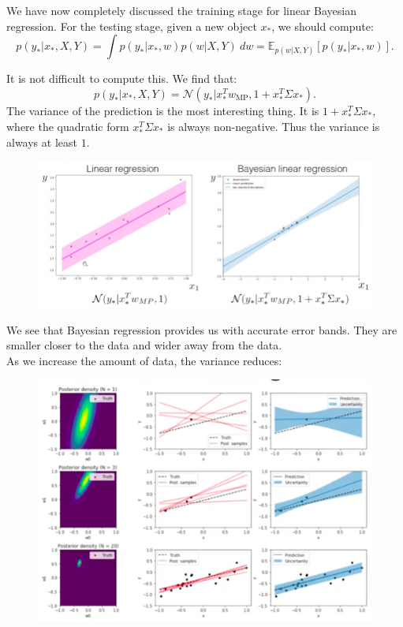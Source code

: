 We have now completely discussed the training stage for linear Bayesian regression. For the testing stage, given a new object $x_*$, we should compute:
\begin{equation*}
p(y_* | x_*, X, Y) = \int p(y_* | x_*, w) p(w | X, Y)\ dw = \mathbb{E}_{p(w|X,Y)} \left[ p(y_* | x_*, w) \right].
\end{equation*}

It is not difficult to compute this. We find that:
\begin{equation*}
p(y_* | x_*, X, Y) = \mathcal{N}(y_* | x_*^T w_{\text{MP}}, 1 + x_*^T \Sigma x_* ).
\end{equation*}
The variance of the prediction is the most interesting thing. It is $1 + x_*^T \Sigma x_*$, where the quadratic form $x_*^T \Sigma x_*$ is always non-negative. Thus the variance is always at least $1$. 
\begin{figure}[H]
\centering
\includegraphics[scale=0.4]{variancebayesianregression.png}
\end{figure}
We see that Bayesian regression provides us with accurate error bands. They are smaller closer to the data and wider away from the data.\\

As we increase the amount of data, the variance reduces:
\begin{figure}[H]
\centering
\includegraphics[scale=0.4]{moredatavariance.png}
\end{figure}










